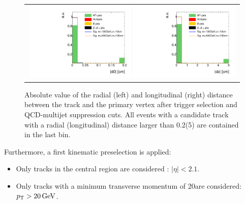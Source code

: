 \begin{figure}[!h]
  \centering 
  \begin{tabular}{c}
    \includegraphics[width=0.49\textwidth]{figures/analysis_2/AnalysisSelection/chiTracksQCDsupressionTrigger_2Signals_FullBkg/htrackd0_lin.pdf}
    \includegraphics[width=0.49\textwidth]{figures/analysis_2/AnalysisSelection/chiTracksQCDsupressionTrigger_2Signals_FullBkg/htrackdz_lin.pdf}
  \end{tabular}
  \caption{Absolute value of the radial (left) and longitudinal (right) distance between the track and the primary vertex after trigger selection and QCD-multijet suppression cuts. 
           All events with a candidate track with a radial (longitudinal) distance larger than 0.2\cm (5\cm) are contained in the last bin.}
  \label{fig:d0_dz}
\vspace{20pt}
\end{figure}
\newpage
Furthermore, a first kinematic preselection is applied:
\begin{itemize}
\renewcommand{\labelitemi}{\footnotesize{\ding{118}}}
\item Only tracks in the central region are considered : $|\eta|<2.1$.
\item Only tracks with a minimum transverse momentum of 20\gev are considered:\\
       \mbox{$p_{\text{T}}>20\,\text{Ge}\kern-0.06667em\text{V}$}.\\
\end{itemize}

